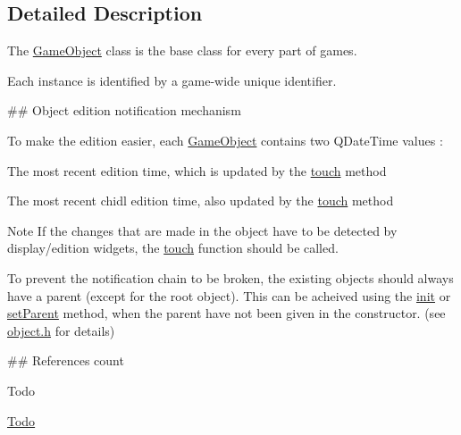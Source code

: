 \subsection{\-Detailed \-Description}
\-The \hyperlink{class_game_object}{\-Game\-Object} class is the base class for every part of games. 

\-Each instance is identified by a game-\/wide unique identifier.

\#\# \-Object edition notification mechanism

\-To make the edition easier, each \hyperlink{class_game_object}{\-Game\-Object} contains two \-Q\-Date\-Time values \-:
\begin{DoxyItemize}
\item \-The most recent edition time, which is updated by the \hyperlink{class_game_object_a2130d5674df041b5a7eaf987f9b1e642}{touch} method
\item \-The most recent chidl edition time, also updated by the \hyperlink{class_game_object_a2130d5674df041b5a7eaf987f9b1e642}{touch} method
\end{DoxyItemize}

\begin{DoxyNote}{\-Note}
\-If the changes that are made in the object have to be detected by display/edition widgets, the \hyperlink{class_game_object_a2130d5674df041b5a7eaf987f9b1e642}{touch} function should be called. 

\-To prevent the notification chain to be broken, the existing objects should always have a parent (except for the root object). \-This can be acheived using the \hyperlink{class_game_object_abb6a1fa1a89307820874179b20010f6d}{init} or \hyperlink{class_game_object_ae34944b23d5d7d472d5c8da3f42fb2e3}{set\-Parent} method, when the parent have not been given in the constructor. (see \hyperlink{object_8h}{object.\-h} for details)
\end{DoxyNote}
\#\# \-References count

\begin{DoxyRefDesc}{\-Todo}
\item[\hyperlink{todo__todo000001}{\-Todo}]\end{DoxyRefDesc}


